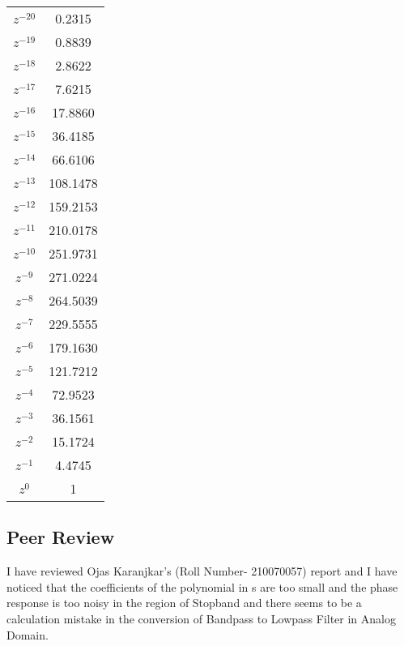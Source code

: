 \documentclass[12pt]{article}
\begin{document}
\begin{table}[H]
\begin{minipage}{.5\linewidth}
\begin{tabular}{ |c|c| }
      $z^{-20}$ & 0.2315 \\
      $z^{-19}$ & 0.8839 \\
      $z^{-18}$ & 2.8622 \\
      $z^{-17}$ & 7.6215 \\
      $z^{-16}$ & 17.8860 \\
      $z^{-15}$ & 36.4185 \\
      $z^{-14}$ & 66.6106 \\
      $z^{-13}$ & 108.1478 \\
      $z^{-12}$ & 159.2153 \\
      $z^{-11}$ & 210.0178 \\
      $z^{-10}$ & 251.9731 \\
      $z^{-9}$ & 271.0224 \\
      $z^{-8}$ & 264.5039 \\
      $z^{-7}$ & 229.5555 \\
      $z^{-6}$ & 179.1630 \\
      $z^{-5}$ & 121.7212 \\
      $z^{-4}$ & 72.9523 \\
      $z^{-3}$ & 36.1561 \\
      $z^{-2}$ & 15.1724 \\
      $z^{-1}$ & 4.4745 \\
      $z^{0}$ & 1 \\
      \bottomrule
    \end{tabular}
  \end{minipage}
\end{table}

\newpage


\subsection{Peer Review}

I have reviewed Ojas Karanjkar's (Roll Number- 210070057) report and I have noticed that the coefficients of the polynomial in s are too small and the phase response is too noisy in the region of Stopband and there seems to be a calculation mistake in the conversion of Bandpass to Lowpass Filter in Analog Domain.
\end{document}

